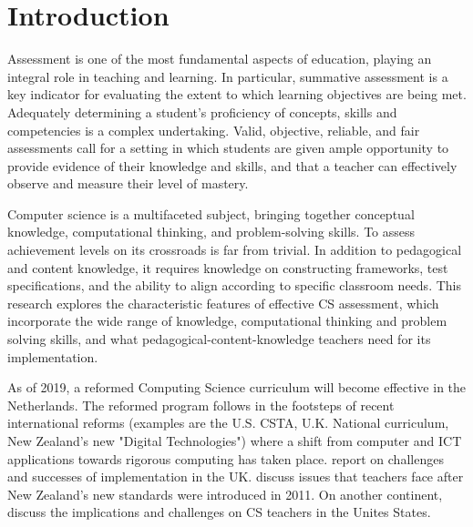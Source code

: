 \section{Introduction}\label{sec:intro}
Assessment is one of the most fundamental aspects of education, playing an integral role in teaching and learning. In particular, summative assessment is a key indicator for evaluating the extent to which learning objectives are being met. Adequately determining a student's proficiency of concepts, skills and competencies is a complex undertaking. Valid, objective, reliable, and fair assessments call for a setting in which students are given ample opportunity to provide evidence of their knowledge and skills, and that a teacher can effectively observe and measure their level of mastery.

Computer science is a multifaceted subject, bringing together conceptual knowledge, computational thinking, and problem-solving skills. To assess achievement levels on its crossroads is far from trivial. In addition to pedagogical and content knowledge, it requires knowledge on constructing frameworks, test specifications, and the ability to align according to specific classroom needs. This research explores the characteristic features of effective CS assessment, which incorporate the wide range of knowledge, computational thinking and problem solving skills, and what pedagogical-content-knowledge teachers need for its implementation.



As of 2019, a reformed Computing Science curriculum will become effective in the Netherlands. The reformed program follows in the footsteps of recent international reforms (examples are the U.S. CSTA, U.K. National curriculum, New Zealand's new "Digital Technologies") where a shift from computer and ICT applications towards rigorous computing has taken place.  report on challenges and successes of implementation in the UK.  discuss issues that teachers face after New Zealand's new standards were introduced in 2011. On another continent,  discuss the implications and challenges on CS teachers in the Unites States.

